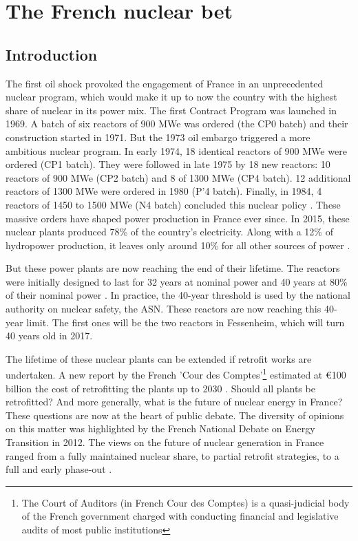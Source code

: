 \chapter{The French nuclear bet} \label{chap:nuclear_bet}


\section{Introduction} \label{sec:introduction_chap2}
The first oil shock provoked the engagement of France in an unprecedented nuclear program, which would make it up to now the country with the highest share of nuclear in its power mix.
The first Contract Program was launched in 1969. A batch of six reactors of 900 MWe was ordered (the CP0 batch) and their construction started in 1971. But the 1973 oil embargo triggered a more ambitious nuclear program. In early 1974, 18 identical reactors of 900 MWe were ordered (CP1 batch). They were followed in late 1975 by 18 new reactors: 10 reactors of 900 MWe (CP2 batch) and 8 of 1300 MWe (CP4 batch). 12 additional reactors of 1300 MWe were ordered in 1980 (P'4 batch). Finally, in 1984, 4 reactors of 1450 to 1500 MWe (N4 batch) concluded this nuclear policy \citep{Boccard2014}.
These massive orders have shaped power production in France ever since. In 2015, these nuclear plants produced 78\% of the country's electricity. Along with a 12\% of hydropower production, it leaves only around 10\% for all other sources of power \citep{RTE2014}.

But these power plants are now reaching the end of their lifetime. The reactors were initially designed to last for 32 years at nominal power and 40 years at 80\% of their nominal power \citep[p. 31]{Charpin2000}. In practice, the 40-year threshold is used by the national authority on nuclear safety, the ASN. These reactors are now reaching this 40-year limit. The first ones will be the two reactors in Fessenheim, which will turn 40 years old in 2017.

The lifetime of these nuclear plants can be extended if retrofit works are undertaken. 
A new report by the French 'Cour des Comptes'\footnote{
	The Court of Auditors (in French Cour des Comptes) is a quasi-judicial body of the French government charged with conducting financial and legislative audits of most public institutions} 
estimated at \euro 100 billion the cost of retrofitting the plants up to 2030 \citep{CourdesComptes2016}. Should all plants be retrofitted? And more generally, what is the future of nuclear energy in France?
These questions are now at the heart of public debate. The diversity of opinions on this matter was highlighted by the French National Debate on Energy Transition in 2012. The views on the future of nuclear generation in France ranged from a fully maintained nuclear share, to partial retrofit strategies, to a full and early phase-out \citep{DNTE_gt2}. 

